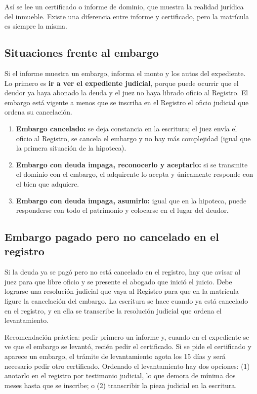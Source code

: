 \documentclass[12pt,oneside]{book}
\begin{document}
Así se lee un certificado o informe de dominio, que muestra la realidad jurídica del inmueble. Existe una diferencia entre informe y certificado, pero la matrícula es siempre la misma.

\subsection{Situaciones frente al embargo}

Si el informe muestra un embargo, informa el monto y los autos del expediente. Lo primero es \textbf{ir a ver el expediente judicial}, porque puede ocurrir que el deudor ya haya abonado la deuda y el juez no haya librado oficio al Registro. El embargo está vigente a menos que se inscriba en el Registro el oficio judicial que ordena su cancelación.

\begin{enumerate}
\item \textbf{Embargo cancelado:} se deja constancia en la escritura; el juez envía el oficio al Registro, se cancela el embargo y no hay más complejidad (igual que la primera situación de la hipoteca).
\item \textbf{Embargo con deuda impaga, reconocerlo y aceptarlo:} si se transmite el dominio con el embargo, el adquirente lo acepta y únicamente responde con el bien que adquiere.
\item \textbf{Embargo con deuda impaga, asumirlo:} igual que en la hipoteca, puede responderse con todo el patrimonio y colocarse en el lugar del deudor.
\end{enumerate}

\subsection{Embargo pagado pero no cancelado en el registro}

Si la deuda ya se pagó pero no está cancelado en el registro, hay que avisar al juez para que libre oficio y se presente el abogado que inició el juicio. Debe lograrse una resolución judicial que vaya al Registro para que en la matrícula figure la cancelación del embargo. La escritura se hace cuando ya está cancelado en el registro, y en ella se transcribe la resolución judicial que ordena el levantamiento.

Recomendación práctica: pedir primero un informe y, cuando en el expediente se ve que el embargo se levantó, recién pedir el certificado. Si se pide el certificado y aparece un embargo, el trámite de levantamiento agota los 15 días y será necesario pedir otro certificado. Ordenado el levantamiento hay dos opciones: (1) anotarlo en el registro por testimonio judicial, lo que demora de mínima dos meses hasta que se inscribe; o (2) transcribir la pieza judicial en la escritura.
\end{document}
